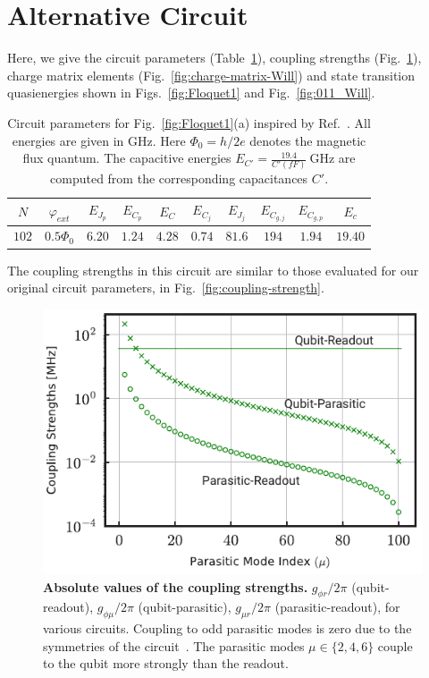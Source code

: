 \documentclass[%
reprint,
superscriptaddress,
 amsmath,amssymb,
 aps,
 prx,
longbibliography,
floatfix,
]{revtex4-2}
\begin{document}
\section{Alternative Circuit}\label{app:alt_circuit1}
Here, we give the circuit parameters (Table~\ref{tab:circuit_params_Will}), coupling strengths (Fig.~\ref{fig:coupling-strength-Will}), charge matrix elements (Fig.~\ref{fig:charge-matrix-Will}) and state transition quasienergies shown in Figs.~\ref{fig:Floquet1} and Fig.~\ref{fig:011_Will}. 
\begin{table}[htb]
\centering
\begin{tabular}{|c|c|c|c|c|c|c|c|c|c|}
    \hline
     $N$ & $\varphi_{ext}$ & $E_{J_p}$ & $E_{C_p}$ & $E_C$ & $E_{C_j}$ & $E_{J_j}$ & $E_{C_{g,j}}$ & $E_{C_{g,p}}$ & $E_c$ \\
    \hline
    $102$ & $0.5\Phi_0$ & $6.20$ & $1.24$ & $4.28$ & $0.74$ & $81.6$ & $194$ & $1.94$ & $19.40$ \\
    \hline
\end{tabular}
\caption{Circuit parameters for Fig.~\ref{fig:Floquet1}(a) inspired by Ref.~\cite{ding_high-fidelity_2023}. All energies are given in GHz. Here $\Phi_0=h/2e$ denotes the magnetic flux quantum. The capacitive energies $E_{C'}=\frac{19.4}{{C'}(fF)} \ \mathrm{GHz}$ are computed from the corresponding capacitances $C'$.}
\label{tab:circuit_params_Will}
\end{table}

The coupling strengths in this circuit are similar to those evaluated for our original circuit parameters, in Fig.~\ref{fig:coupling-strength}.
\begin{figure}[htb]
    \centering
    \includegraphics[width=\linewidth]{Supp_Fig/Coupling-Will.pdf}
    \caption{{\bf Absolute values of the coupling strengths.} $g_{\phi r}/2\pi$ (qubit-readout), $g_{\phi\mu}/2\pi$ (qubit-parasitic), $g_{\mu r}/2\pi$ (parasitic-readout), for various circuits. Coupling to odd parasitic modes is zero due to the symmetries of the circuit~\cite{viola2015collective}. The parasitic modes $\mu\in\{2,4,6\}$ couple to the qubit more strongly than the readout.}
    \label{fig:coupling-strength-Will}
\end{figure}
\end{document}
